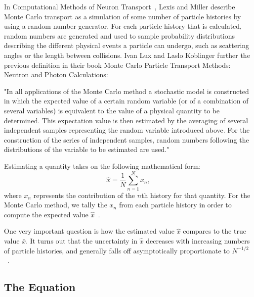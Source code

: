 In Computational Methods of Neuron Transport~\cite{LewisCMNT}, Lexis and Miller describe Monte Carlo transport as a simulation of some number of particle histories by using a random number generator.
%
For each particle history that is calculated, random numbers are generated and used to sample probability distributions describing the different physical events a particle can undergo, such as scattering angles or the length between collisions.
%
Ivan Lux and Laslo Koblinger further the previous definition in their book Monte Carlo Particle Transport Methods: Neutron and Photon Calculations:
%
\begin{displayquote}
"In all applications of the Monte Carlo method a stochastic model is constructed in which the expected value of a certain random variable (or of a combination of several variables) is equivalent to the value of a physical quantity to be determined. This expectation value is then estimated by the averaging of several independent samples representing the random variable introduced above. For the construction of the series of independent samples, random numbers following the distributions of the variable to be estimated are used." ~\cite{LuxMCPTM}
\end{displayquote}

% 
Estimating a quantity takes on the following mathematical form:
$$ \hat{x} = \frac{1}{N} \sum_{n=1}^{N} x_{n}, $$
where $x_{n}$ represents the contribution of the $n$th history for that quantity.
%
For the Monte Carlo method, we tally the $x_{n}$ from each particle history in order to compute the expected value $\hat{x}$~\cite{LewisCMNT}.
%

%
One very important question is how the estimated value $\hat{x}$ compares to the true value $\bar{x}$.
%
It turns out that the uncertainty in $\hat{x}$ decreases with increasing numbers of particle histories, and generally falls off asymptotically proportionate to $N^{-1/2}$~\cite{LewisCMNT}.
%

\subsection{ \textbf{ The Equation} }

